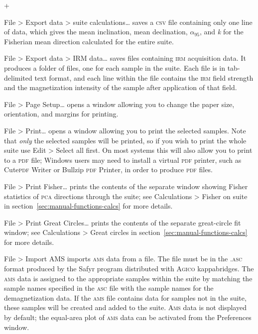 \documentclass[a4paper]{article}
\newcommand{\menuitemlabel}[1]{%
\mbox{\textsf{#1}}\hfil}
\newenvironment{menuitemlist}%
{\begin{list}{}{%
\renewcommand{\makelabel}{\menuitemlabel}%
\setlength{\labelwidth}{35pt}%
\setlength{\leftmargin}%
             {\labelwidth+\labelsep}}}%
{\end{list}}
\newcommand{\ppcmd}[1]{\textsf{#1}} %
\newcommand{\caps}[1]{\textsc{#1}} %
\newcommand{\submenu}{ \textgreater{} } %
\newcommand{\alnifi}{$\alpha_{95}$}
\begin{document}
\begin{menuitemlist}
\item[File\submenu Export data\submenu suite calculations\ldots] saves a
  \caps{csv} file containing only one line of data, which gives the mean
  inclination, mean declination, \alnifi{}, and {\em k} for the Fisherian mean
  direction calculated for the entire suite.

\item[File\submenu Export data\submenu IRM data\ldots] saves files containing
\caps{irm} acquisition data. It produces a folder of files, one for each
sample in the suite. Each file is in tab-delimited text format, and each line
within the file contains the \caps{irm} field strength and the magnetization
intensity of the sample after application of that field.

\item[File\submenu Page Setup\ldots] opens a window allowing you
to change the paper size, orientation, and margins for printing.

\item[File\submenu Print\ldots] opens a window allowing you to print the
selected samples. Note that {\em only} the selected samples will be printed,
so if you wish to print the whole suite use \ppcmd{Edit\submenu Select all} first.
On most systems this will also allow you to print to a \caps{pdf} file;
Windows users may need to install a virtual \caps{pdf} printer, such as
Cute\caps{pdf} Writer or Bullzip \caps{pdf} Printer, in order to produce
\caps{pdf} files.

\item[File\submenu Print Fisher\ldots] prints the contents of the separate
window showing Fisher statistics of \caps{pca} directions through the suite;
see \ppcmd{Calculations\submenu Fisher on suite} in
section~\ref{sec:manual-functions-calcs} for more details.

\item[File\submenu Print Great Circles\ldots] prints the contents of the
  separate great-circle fit window; see \ppcmd{Calculations\submenu Great
    circles} in section~\ref{sec:manual-functions-calcs} for more details.

\item[File\submenu Import AMS] imports \caps{ams} data from a file. The
file must be in the \caps{.asc} format produced by the \ppcmd{Safyr} program
distributed with \caps{Agico} kappabridges. The \caps{ams} data is assigned
to the appropriate samples within the suite by matching the sample names
specified in the \caps{asc} file with the sample names for the
demagnetization data. If the \caps{ams} file contains data for samples not in
the suite, these samples will be created and added to the suite. \caps{Ams}
data is not displayed by default; the equal-area plot of \caps{ams} data can
be activated from the \ppcmd{Preferences} window.


\end{menuitemlist}
\end{document}
